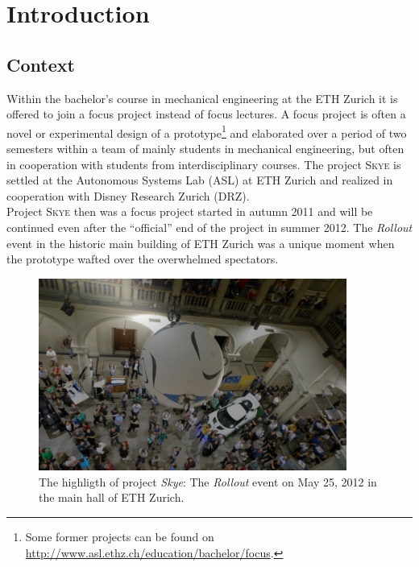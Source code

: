 \chapter{Introduction}\label{sec:introduction}
\graphicspath{{graphics/}{graphics/systems/}}


\section{Context}
\label{sec:context}

Within the bachelor's course in mechanical engineering at the ETH Zurich it is offered to join a focus project instead of focus lectures. A focus project is often a novel or experimental design of a prototype\footnote{Some former projects can be found on \url{http://www.asl.ethz.ch/education/bachelor/focus}.} and elaborated over a period of two semesters within a team of mainly students in mechanical engineering, but often in cooperation with students from interdisciplinary courses. The project \textsc{Skye} is settled at the Autonomous Systems Lab (ASL) at ETH Zurich and realized in cooperation with Disney Research Zurich (DRZ). \\
Project \textsc{Skye} then was a focus project started in autumn \num{2011} and will be continued even after the ``official'' end of the project in summer 2012. The \textit{Rollout} event in the historic main building of ETH Zurich was a unique moment when the prototype wafted over the overwhelmed spectators. \\

\begin{figure}[H]
	\centering
    \includegraphics[width = 0.9\textwidth]{graphics/rollout2.jpg}
  \caption{The highligth of project \textit{Skye}: The \textit{Rollout} event on May 25, 2012 in the main hall of ETH Zurich.}
  \label{fig:rollout}
\end{figure}


